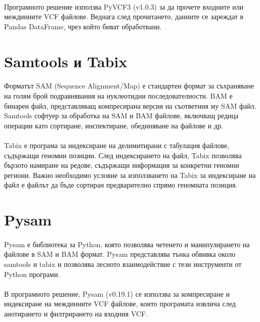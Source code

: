 \documentclass[pdftex,cyrillic,14pt,a4page,twoside,openright]{extreport}
\begin{document}
\paragraph{}
Програмното решение използва PyVCF3 (v1.0.3) за да прочете входните или междинните VCF файлове. Веднага след прочитането, данните се зареждат в Pandas DataFrame, чрез който биват обработвани.

\section{Samtools и Tabix}\label{sec:samtools_tabix}
\paragraph{}
Форматът SAM (Sequence Alignment/Map) е стандартен формат за съхраняване на голям брой подравнявания на нуклеотидни последователности. BAM е бинарен файл, представляващ компресирана версия на съответния му SAM файл. Samtools \cite{li2009} софтуер за обработка на SAM и BAM файлове, включващ редица операции като сортиране, инспектиране, обединяване на файлове и др.

\paragraph{}
Tabix е 	програма за индексиране на делимитирани с табулация файлове, съдържащи геномни позиции. След индексирането на файл, Tabix позволява бързото намиране на редове, съдържащи информация за конкретни геномни региони. Важно необходимо условие за използването на Tabix за индексиране на файл е файлът да бъде сортиран предварително спрямо геномната позиция. 

\section{Pysam}\label{sec:pysam}
\paragraph{}
Pysam \cite{pysam} е библиотека за Python, която позволява четенето и манипулирането на файлове в SAM и BAM формат. Pysam представлява тънка обвивка около samtools и tabix и позволява лесното взаимодействие с тези инструменти от Python програми.

\paragraph{}
В програмното решение, Pysam (v0.19.1) се използва за компресиране и индексиране на междинните VCF файлове, които програмата извлича след анотирането и филтрирането на входния VCF.
\end{document}
